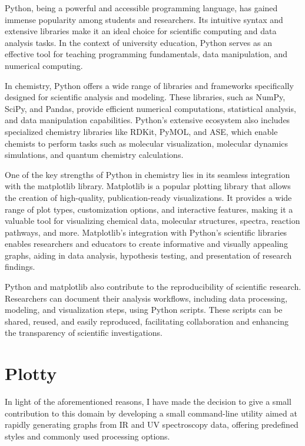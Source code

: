 \documentclass[../Master.tex]{subfiles}
\begin{document}
Python, being a powerful and accessible programming language, has gained immense popularity among students and researchers. Its intuitive syntax and extensive libraries make it an ideal choice for scientific computing and data analysis tasks. In the context of university education, Python serves as an effective tool for teaching programming fundamentals, data manipulation, and numerical computing.

In chemistry, Python offers a wide range of libraries and frameworks specifically designed for scientific analysis and modeling. These libraries, such as NumPy, SciPy, and Pandas, provide efficient numerical computations, statistical analysis, and data manipulation capabilities. Python's extensive ecosystem also includes specialized chemistry libraries like RDKit, PyMOL, and ASE, which enable chemists to perform tasks such as molecular visualization, molecular dynamics simulations, and quantum chemistry calculations.

One of the key strengths of Python in chemistry lies in its seamless integration with the matplotlib library. Matplotlib is a popular plotting library that allows the creation of high-quality, publication-ready visualizations. It provides a wide range of plot types, customization options, and interactive features, making it a valuable tool for visualizing chemical data, molecular structures, spectra, reaction pathways, and more. Matplotlib's integration with Python's scientific libraries enables researchers and educators to create informative and visually appealing graphs, aiding in data analysis, hypothesis testing, and presentation of research findings.

Python and matplotlib also contribute to the reproducibility of scientific research. Researchers can document their analysis workflows, including data processing, modeling, and visualization steps, using Python scripts. These scripts can be shared, reused, and easily reproduced, facilitating collaboration and enhancing the transparency of scientific investigations.

\section{Plotty}\label{sec:plotty}

In light of the aforementioned reasons, I have made the decision to give a small contribution to this domain by developing a small command-line utility aimed at rapidly generating graphs from IR and UV spectroscopy data, offering predefined styles and commonly used processing options.
\end{document}
